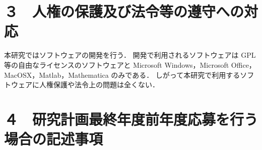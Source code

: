 \documentclass[11pt,a4j,dvipdfmx]{jarticle} 					%
\newcommand{\研究課題名}{人工知能のためのLispシステム}
\newcommand{\研究機関名}{大阪公立大学工業高等専門学校}
\newcommand{\研究代表者氏名}{新妻弘崇}
\newcommand{\研究期間の最終元号年度}{11}  %
\begin{document}




\section{３　人権の保護及び法令等の遵守への対応}


本研究ではソフトウェアの開発を行う．
開発で利用されるソフトウェアは
GPL等の自由なライセンスのソフトウェアと
Microsoft Windows，Microsoft Office，MacOSX，Matlab，Mathematica
のみである．
しがって本研究で利用するソフトウェアに人権保護や法令上の問題は全くない．








\section{４　研究計画最終年度前年度応募を行う場合の記述事項}

\newcommand{\最終年度研究種目名}{}
\newcommand{\最終年度研究課題番号}{}
\newcommand{\最終年度研究課題名}{}
\newcommand{\最終年度研究期間}{}

\end{document}

